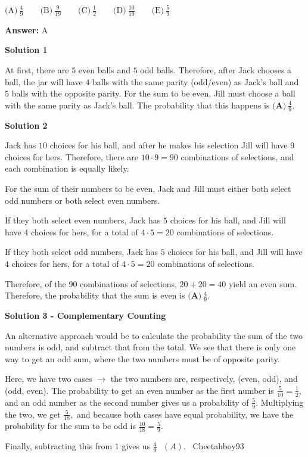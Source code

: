 \begin{enumerate}
 $\text{(A)}\ \frac{4}{9} \qquad \text{(B)}\ \frac{9}{19} \qquad \text{(C)}\ \frac{1}{2} \qquad \text{(D)}\ \frac{10}{19} \qquad \text{(E)}\ \frac{5}{9}$

 \textbf{Answer: }A



\textbf{Solution 1}

At first, there are $5$ even balls and $5$ odd balls.  Therefore, after Jack chooses a ball, the jar will have $4$ balls with the same parity (odd/even) as Jack's ball and $5$ balls with the opposite parity.  For the sum to be even, Jill must choose a ball with the same parity as Jack's ball.  The probability that this happens is $\boxed{\textbf{(A)}\ \frac{4}{9}}$.

 



\textbf{Solution 2}

Jack has $10$ choices for his ball, and after he makes his selection Jill will have $9$ choices for hers.  Therefore, there are $10 \cdot 9 = 90$ combinations of selections, and each combination is equally likely.

 For the sum of their numbers to be even, Jack and Jill must either both select odd numbers or both select even numbers.  

 If they both select even numbers, Jack has $5$ choices for his ball, and Jill will have $4$ choices for hers, for a total of $4\cdot5 = 20$ combinations of selections.

 If they both select odd numbers, Jack has $5$ choices for his ball, and Jill will have $4$ choices for hers, for a total of $4\cdot5 = 20$ combinations of selections.

 Therefore, of the $90$ combinations of selections, $20+20=40$ yield an even sum.  Therefore, the probability that the sum is even is $\boxed{\textbf{(A)}\ \frac{4}{9}}$.

 



\textbf{Solution 3 - Complementary Counting}

An alternative approach would be to calculate the probability the sum of the two numbers is odd, and subtract that from the total. We see that there is only one way to get an odd sum, where the two numbers must be of opposite parity.

 Here, we have two cases $\rightarrow$ the two numbers are, respectively, (even, odd), and (odd, even). The probability to get an even number as the first number is $\frac{5}{10} = \frac{1}{2},$ and an odd number as the second number gives us a probability of $\frac{5}{9}.$ Multiplying the two, we get $\frac{5}{18},$ and because both cases have equal probability, we have the probability for the sum to be odd is $\frac{10}{18} = \frac{5}{9}.$

 Finally, subtracting this from $1$ gives us $\boxed{\frac{4}{9} \text{ } (A)}.$~ Cheetahboy93

 


\end{enumerate}